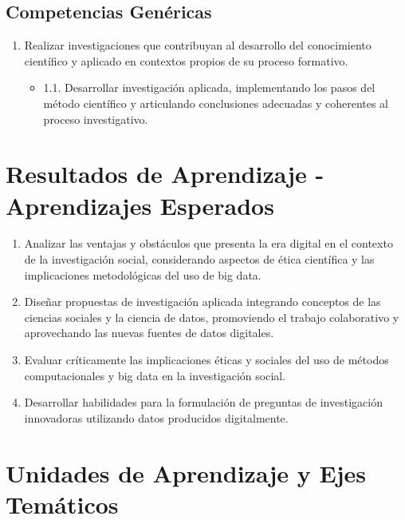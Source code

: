 \documentclass[11pt,letter,]{article}
\providecommand{\tightlist}{%
  \setlength{\itemsep}{0pt}\setlength{\parskip}{0pt}}
\begin{document}
\hypertarget{competencias-genuxe9ricas}{%
\subsection{Competencias Genéricas}\label{competencias-genuxe9ricas}}

\begin{enumerate}
\def\labelenumi{\arabic{enumi}.}
\tightlist
\item
  Realizar investigaciones que contribuyan al desarrollo del
  conocimiento científico y aplicado en contextos propios de su proceso
  formativo.

  \begin{itemize}
  \tightlist
  \item
    1.1. Desarrollar investigación aplicada, implementando los pasos del
    método científico y articulando conclusiones adecuadas y coherentes
    al proceso investigativo.
  \end{itemize}
\end{enumerate}

\hypertarget{resultados-de-aprendizaje---aprendizajes-esperados}{%
\section{Resultados de Aprendizaje - Aprendizajes
Esperados}\label{resultados-de-aprendizaje---aprendizajes-esperados}}

\begin{enumerate}
\def\labelenumi{\arabic{enumi}.}
\tightlist
\item
  Analizar las ventajas y obstáculos que presenta la era digital en el
  contexto de la investigación social, considerando aspectos de ética
  científica y las implicaciones metodológicas del uso de big data.
\item
  Diseñar propuestas de investigación aplicada integrando conceptos de
  las ciencias sociales y la ciencia de datos, promoviendo el trabajo
  colaborativo y aprovechando las nuevas fuentes de datos digitales.
\item
  Evaluar críticamente las implicaciones éticas y sociales del uso de
  métodos computacionales y big data en la investigación social.
\item
  Desarrollar habilidades para la formulación de preguntas de
  investigación innovadoras utilizando datos producidos digitalmente.
\end{enumerate}

\hypertarget{unidades-de-aprendizaje-y-ejes-temuxe1ticos}{%
\section{Unidades de Aprendizaje y Ejes
Temáticos}\label{unidades-de-aprendizaje-y-ejes-temuxe1ticos}}
\end{document}
